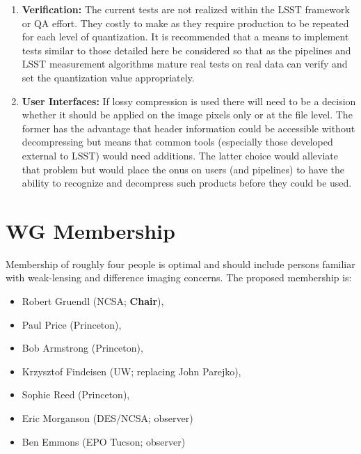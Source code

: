 \begin{enumerate}
\item {\bf Verification:} The current tests are not realized within the LSST framework or QA effort.
They costly to make as they require production to be repeated for each level of quantization.  
It is recommended that a means to implement tests similar to those detailed here be considered 
so that as the pipelines and LSST measurement algorithms mature real tests on real data can verify
and set the quantization value appropriately.

\item {\bf User Interfaces:} If lossy compression is used there will need to be a decision whether it
should be applied on the image pixels only or at the file level.  The former has the advantage that 
header information could be accessible without decompressing but means that common tools (especially
those developed external to LSST) would need additions.  The latter choice would alleviate that problem
but would place the onus on users (and pipelines) to have the ability to recognize and decompress 
such products before they could be used.

\end{enumerate}


\section{WG Membership}

Membership of roughly four people is optimal and should include persons familiar 
with weak-lensing and difference imaging concerns.
The proposed membership is:

\begin{itemize}
    \item Robert Gruendl (NCSA; \textbf{Chair}),
    \item Paul Price (Princeton),
    \item Bob Armstrong (Princeton),
    \item Krzysztof Findeisen (UW; replacing John Parejko),
    \item Sophie Reed (Princeton),
    \item Eric Morganson (DES/NCSA; observer)
    \item Ben Emmons (EPO Tucson; observer)
\end{itemize}

